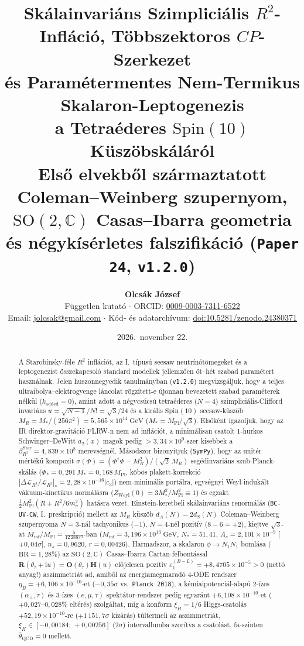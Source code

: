 \documentclass[11pt,a4paper]{article}
\title{\textbf{Skálainvariáns Szimpliciális \texorpdfstring{$R^2$}{R2}-Infláció, Többszektoros \texorpdfstring{$CP$}{CP}-Szerkezet\\
és Paramétermentes Nem-Termikus Skalaron-Leptogenezis\\
a Tetraéderes \texorpdfstring{$\mathrm{Spin}(10)$}{Spin(10)} Küszöbskáláról}\\[0.35em]
\large Első elvekből származtatott Coleman--Weinberg szupernyom, \texorpdfstring{$\mathrm{SO}(2,\mathbb{C})$}{SO(2,C)} Casas--Ibarra geometria és négykísérletes falszifikáció (\texttt{Paper 24}, \texttt{v1.2.0})}
\author{\textbf{Olcsák József}\\
\small Független kutató $\cdot$ ORCID: \href{https://orcid.org/0009-0003-7311-6522}{0009-0003-7311-6522}\\
\small Email: \href{mailto:jolcsak@gmail.com}{jolcsak@gmail.com} $\cdot$ Kód- és adatarchívum: \href{https://doi.org/10.5281/zenodo.24380371}{doi:10.5281/zenodo.24380371}}
\date{2026.\ november 22.}
\begin{document}
\maketitle

\renewcommand{\contentsname}{Tartalomjegyzék}
\renewcommand{\figurename}{Ábra}
\renewcommand{\tablename}{Táblázat}
\renewcommand{\refname}{Irodalomjegyzék}

\begin{abstract}
\noindent A Starobinsky-féle $R^2$ inflációt, az I.\ típusú seesaw neutrínótömegeket és a leptogenezist összekapcsoló standard modellek jellemzően öt--hét szabad paramétert használnak. Jelen huszonnegyedik tanulmányban (\texttt{v1.2.0}) megvizsgáljuk, hogy a teljes ultraibolya--elektrogyenge láncolat rögzített-e újonnan bevezetett szabad paraméterek nélkül ($k_{\mathrm{added}} = 0$), amint adott a négycsúcsú tetraéderes ($N=4$) szimpliciális-Clifford invariáns $u = \sqrt{N-1}/N! = \sqrt{3}/24$ és a királis $\mathrm{Spin}(10)$ seesaw-küszöb $M_R = M_*/(256\pi^2) = 5{,}565\times 10^{14}\;\mathrm{GeV}$ ($M_* = M_{\mathrm{Pl}}/\sqrt{3}$). Elsőként igazoljuk, hogy az IR direktor-gravitáció FLRW-n nem ad inflációt, a minimálisan csatolt 1-hurkos Schwinger--DeWitt $a_2(x)$ magok pedig $>3{,}34\times 10^9$-szer kisebbek a $\beta_{R^2}^{\mathrm{Star}} = 4{,}839\times 10^8$ merevségnél. Másodszor bizonyítjuk (\texttt{SymPy}), hogy az unitér mértékű kompozit $\sigma(\Phi) = (\Phi^\dagger\Phi - M_R^2)/(\sqrt{2}\,M_R)$ segédinvariáns szub-Planck-skálás ($\Phi_* = 0{,}291\,M_* = 0{,}168\,M_{\mathrm{Pl}}$, köbös plakett-korrekció $|\Delta\mathcal{L}_{R^3}/\mathcal{L}_{R^2}|_* = 2{,}28\times 10^{-16}|c_3|$) nem-minimális portálra, egységnyi Weyl-indukált vákuum-kinetikus normálásra ($Z_{\mathrm{Weyl}}(0) = 3M_*^2/M_{\mathrm{Pl}}^2 \equiv 1$) és egzakt $\frac{1}{2}M_{\mathrm{Pl}}^2(R + R^2/6m_\sigma^2)$ hatásra vezet. Einstein-keretbeli skálainvariáns renormálás (\texttt{BC-UV-CW}, I.\ preskripció) mellett az $M_R$ küszöb $d_A(N) - 2d_S(N)$ Coleman--Weinberg szupernyoma $N=3$-nál tachyonikus ($-1$), $N=4$-nél pozitív ($8 - 6 = +2$), kiejtve $\sqrt{3}$-at $M_{\mathrm{inf}}/M_{\mathrm{Pl}} = \frac{5}{12\,288\pi^3}$-ban ($M_{\mathrm{inf}} = 3{,}196\times 10^{13}\;\mathrm{GeV}$, $N_* = 51{,}41$, $A_s = 2{,}101\times 10^{-9}$ [$+0{,}04\sigma$], $n_s = 0{,}9620$, $r = 0{,}00426$). Harmadszor, a skalaron $\phi \to N_1 N_1$ bomlása ($\mathrm{BR} = 1{,}28\%$) az $\mathrm{SO}(2,\mathbb{C})$ Casas--Ibarra Cartan-felbontással $\mathbf{R}(\theta_\tau + \mathrm{i}u) = \mathbf{O}(\theta_\tau)\mathbf{H}(u)$ előjelesen pozitív $\varepsilon_1^{(B-L)} = +8{,}4705\times 10^{-5} > 0$ (nettó anyag!) aszimmetriát ad, amiből az energiamegmaradó 4-ODE rendszer $\eta_B = +6{,}106\times 10^{-10}$-et ($-0{,}35\sigma$ vs.\ \texttt{Planck 2018}), a kémiaipotenciál-alapú 2-ízes $(\alpha_\perp,\tau)$ és 3-ízes $(e,\mu,\tau)$ spektátor-rendszer pedig egyaránt $+6{,}108\times 10^{-10}$-et ($+0{,}027\text{--}0{,}028\%$ eltérés) szolgáltat, míg a konform $\xi_H = 1/6$ Higgs-csatolás $+52{,}19\times 10^{-10}$-re ($+1\,151{,}7\sigma$ kizárás) túltermeli az aszimmetriát, $\xi_H \in [-0{,}00184;\,+0{,}00256]$ ($2\sigma$) intervallumba szorítva a csatolást, fa-szinten $\bar{\theta}_{\mathrm{QCD}} = 0$ mellett.
\end{abstract}
\end{document}

